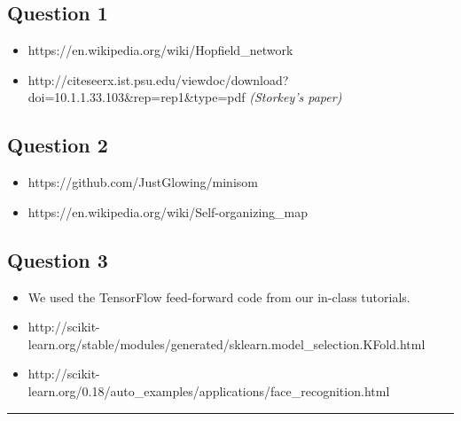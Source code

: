 \documentclass[11pt]{article}
\begin{document}
\subsection{Question 1}\label{question-1}

\begin{itemize}
\item
  https://en.wikipedia.org/wiki/Hopfield\_network
\item
  http://citeseerx.ist.psu.edu/viewdoc/download?doi=10.1.1.33.103\&rep=rep1\&type=pdf
  \textit{(Storkey's paper)}
\end{itemize}

\subsection{Question 2}\label{question-2}

\begin{itemize}
\item
  https://github.com/JustGlowing/minisom
\item
  https://en.wikipedia.org/wiki/Self-organizing\_map
\end{itemize}

\subsection{Question 3}\label{question-3}

\begin{itemize}
\item
  We used the TensorFlow feed-forward code from our in-class tutorials.
\item
  http://scikit-learn.org/stable/modules/generated/sklearn.model\_selection.KFold.html
\item
  http://scikit-learn.org/0.18/auto\_examples/applications/face\_recognition.html
\end{itemize}

\begin{center}\rule{0.5\linewidth}{\linethickness}\end{center}
\end{document}
